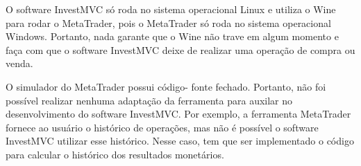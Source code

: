 O software InvestMVC só roda no sistema operacional Linux e utiliza o Wine para rodar o MetaTrader, pois o MetaTrader só roda no sistema operacional Windows. Portanto, nada garante que o Wine não trave em algum momento e faça com que o software InvestMVC deixe de realizar uma operação de compra ou venda.

O simulador do MetaTrader possui código- fonte fechado. Portanto, não foi possível realizar nenhuma adaptação da ferramenta para auxilar no desenvolvimento do software InvestMVC. Por exemplo, a ferramenta MetaTrader fornece ao usuário o histórico de operações, mas não é possível o software InvestMVC utilizar esse histórico. Nesse caso, tem que ser implementado o código para calcular o histórico dos resultados monetários.